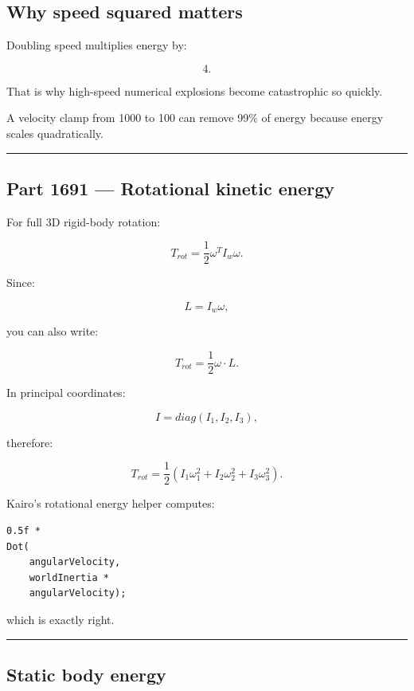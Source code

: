 \subsection{Why speed squared matters}\label{06-engine-ii-ch039-why-speed-squared-matters}

Doubling speed multiplies energy by:

\[
4.
\]

That is why high-speed numerical explosions become catastrophic so quickly.

A velocity clamp from 1000 to 100 can remove 99\% of energy because energy scales quadratically.

\begin{center}\rule{0.5\linewidth}{0.5pt}\end{center}

\subsection{Part 1691 --- Rotational kinetic energy}\label{06-engine-ii-ch039-part-1691-rotational-kinetic-energy}

For full 3D rigid-body rotation:

\[
\boxed{
T_{rot}
=
\frac12
\omega^T
I_w
\omega.
}
\]

Since:

\[
L=I_w\omega,
\]

you can also write:

\[
\boxed{
T_{rot}
=
\frac12
\omega\cdot L.
}
\]

In principal coordinates:

\[
I=
diag(I_1,I_2,I_3),
\]

therefore:

\[
T_{rot}
=
\frac12
(
I_1\omega_1^2+
I_2\omega_2^2+
I_3\omega_3^2
).
\]

Kairo's rotational energy helper computes:

\begin{verbatim}
0.5f *
Dot(
    angularVelocity,
    worldInertia *
    angularVelocity);
\end{verbatim}

which is exactly right.

\begin{center}\rule{0.5\linewidth}{0.5pt}\end{center}

\subsection{Static body energy}\label{06-engine-ii-ch039-static-body-energy}

